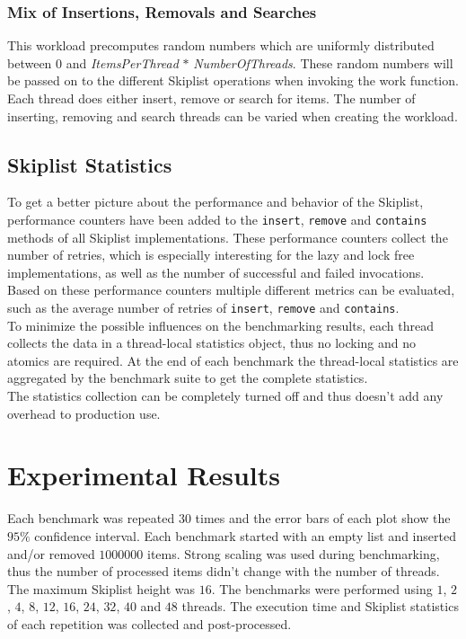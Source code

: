 \subsubsection{Mix of Insertions, Removals and Searches}

This workload precomputes random numbers which are uniformly distributed between $0$ and \textit{ItemsPerThread} $*$ \textit{NumberOfThreads}. These random numbers will be passed on to the different Skiplist operations when invoking the work function. Each thread does either insert, remove or search for items. The number of inserting, removing and search threads can be varied when creating the workload.


\subsection{Skiplist Statistics}
To get a better picture about the performance and behavior of the Skiplist, performance counters have been added to the \texttt{insert}, \texttt{remove} and \texttt{contains} methods of all Skiplist implementations. These performance counters collect the number of retries, which is especially interesting for the lazy and lock free implementations, as well as the number of successful and failed invocations. Based on these performance counters multiple different metrics can be evaluated, such as the average number of retries of \texttt{insert}, \texttt{remove} and \texttt{contains}.\\

\noindent To minimize the possible influences on the benchmarking results, each thread collects the data in a thread-local statistics object, thus no locking and no atomics are required. At the end of each benchmark the thread-local statistics are aggregated by the benchmark suite to get the complete statistics.\\

\noindent The statistics collection can be completely turned off and thus doesn't add any overhead to production use.

\section{Experimental Results}

Each benchmark was repeated $30$ times and the error bars of each plot show the $95\%$ confidence interval. Each benchmark started with an empty list and inserted and/or removed $1000000$ items. Strong scaling was used during benchmarking, thus the number of processed items didn't change with the number of threads. The maximum Skiplist height was $16$. The benchmarks were performed using $1$, $2$, $4$, $8$, $12$, $16$, $24$, $32$, $40$ and $48$ threads. The execution time and Skiplist statistics of each repetition was collected and post-processed.

